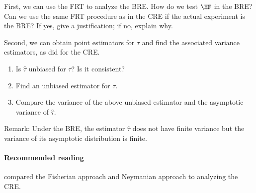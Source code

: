 First, we can use the FRT to analyze the BRE. How do we test $\HF$ in the BRE? Can we use the same FRT procedure as in the CRE if the actual experiment is the BRE? If yes, give a justification; if no, explain why.

Second, we can obtain point estimators for $\tau$ and find the associated variance estimators, as \citet{Neyman:1923} did for the CRE. 
\begin{enumerate}
\item
Is $\hat{\tau}$ unbiased for $\tau$? Is it consistent?
\item
Find an unbiased estimator for $\tau$.
\item
Compare the variance of the above unbiased estimator and the asymptotic variance of $\hat{\tau}$. 
\end{enumerate}

Remark: 
Under the BRE, the estimator $\hat{\tau}$ does not have finite variance but the variance of its asymptotic distribution is finite. 



\paragraph{Recommended reading}

 \citet{Ding:2014} compared the Fisherian approach and Neymanian approach to analyzing the CRE. 


